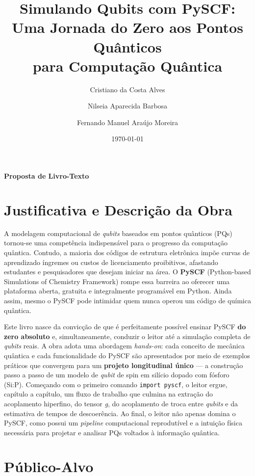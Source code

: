 \documentclass[12pt,a4paper]{article}
\title{\textbf{Simulando Qubits com PySCF:\\ Uma Jornada do Zero aos Pontos Quânticos\\ para Computação Quântica}}
\author{Cristiano da Costa Alves \and Nilseia Aparecida Barbosa \and Fernando Manuel Araújo Moreira}
\date{\today}
\begin{document}
	
	\maketitle
	\thispagestyle{empty}
	\vspace{2cm}
	
	\begin{center}
		\textbf{Proposta de Livro-Texto}
	\end{center}
	
	\section{Justificativa e Descrição da Obra}
	
	A modelagem computacional de \emph{qubits} baseados em pontos quânticos (PQs) tornou-se uma competência indispensável para o progresso da computação quântica. Contudo, a maioria dos códigos de estrutura eletrônica impõe curvas de aprendizado íngremes ou custos de licenciamento proibitivos, afastando estudantes e pesquisadores que desejam iniciar na área. O \textbf{PySCF} (Python-based Simulations of Chemistry Framework) rompe essa barreira ao oferecer uma plataforma aberta, gratuita e integralmente programável em Python. Ainda assim, mesmo o PySCF pode intimidar quem nunca operou um código de química quântica.
	
	Este livro nasce da convicção de que é perfeitamente possível ensinar PySCF \textbf{do zero absoluto} e, simultaneamente, conduzir o leitor até a simulação completa de \emph{qubits} reais. A obra adota uma abordagem \emph{hands-on}: cada conceito de mecânica quântica e cada funcionalidade do PySCF são apresentados por meio de exemplos práticos que convergem para um \textbf{projeto longitudinal único} --- a construção passo a passo de um modelo de \emph{qubit} de spin em silício dopado com fósforo (Si:P). Começando com o primeiro comando \texttt{import pyscf}, o leitor ergue, capítulo a capítulo, um fluxo de trabalho que culmina na extração do acoplamento hiperfino, do tensor \emph{g}, do acoplamento de troca entre \emph{qubits} e da estimativa de tempos de descoerência. Ao final, o leitor não apenas domina o PySCF, como possui um \emph{pipeline} computacional reprodutível e a intuição física necessária para projetar e analisar PQs voltados à informação quântica.
	
	\section{Público-Alvo}
	
\end{document}
